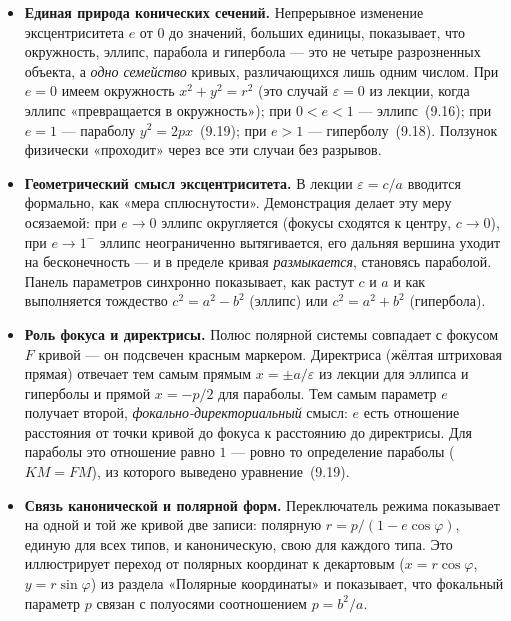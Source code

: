 \begin{itemize}
  \item \textbf{Единая природа конических сечений.} Непрерывное изменение
    эксцентриситета $e$ от $0$ до значений, больших единицы, показывает,
    что окружность, эллипс, парабола и гипербола — это не четыре
    разрозненных объекта, а \emph{одно семейство} кривых, различающихся
    лишь одним числом. При $e = 0$ имеем окружность $x^2 + y^2 = r^2$ (это
    случай $\varepsilon = 0$ из лекции, когда эллипс «превращается в
    окружность»); при $0 < e < 1$ — эллипс~(9.16); при $e = 1$ — параболу
    $y^2 = 2px$~(9.19); при $e > 1$ — гиперболу~(9.18). Ползунок физически
    «проходит» через все эти случаи без разрывов.

  \item \textbf{Геометрический смысл эксцентриситета.} В лекции
    $\varepsilon = c/a$ вводится формально, как «мера сплюснутости».
    Демонстрация делает эту меру осязаемой: при $e \to 0$ эллипс округляется
    (фокусы сходятся к центру, $c \to 0$), при $e \to 1^{-}$ эллипс
    неограниченно вытягивается, его дальняя вершина уходит на
    бесконечность — и в пределе кривая \emph{размыкается}, становясь
    параболой. Панель параметров синхронно показывает, как растут $c$ и $a$
    и как выполняется тождество $c^2 = a^2 - b^2$ (эллипс) или
    $c^2 = a^2 + b^2$ (гипербола).

  \item \textbf{Роль фокуса и директрисы.} Полюс полярной системы совпадает
    с фокусом $F$ кривой — он подсвечен красным маркером. Директриса
    (жёлтая штриховая прямая) отвечает тем самым прямым
    $x = \pm a/\varepsilon$ из лекции для эллипса и гиперболы и прямой
    $x = -p/2$ для параболы. Тем самым параметр $e$ получает второй,
    \emph{фокально-директориальный} смысл: $e$ есть отношение расстояния от
    точки кривой до фокуса к расстоянию до директрисы. Для параболы это
    отношение равно $1$ — ровно то определение параболы
    ($KM = FM$), из которого выведено уравнение~(9.19).

  \item \textbf{Связь канонической и полярной форм.} Переключатель режима
    показывает на одной и той же кривой две записи: полярную
    $r = p/(1 - e\cos\varphi)$, единую для всех типов, и каноническую,
    свою для каждого типа. Это иллюстрирует переход от полярных координат к
    декартовым ($x = r\cos\varphi$, $y = r\sin\varphi$) из раздела
    «Полярные координаты» и показывает, что фокальный параметр $p$ связан с
    полуосями соотношением $p = b^2/a$.
\end{itemize}

